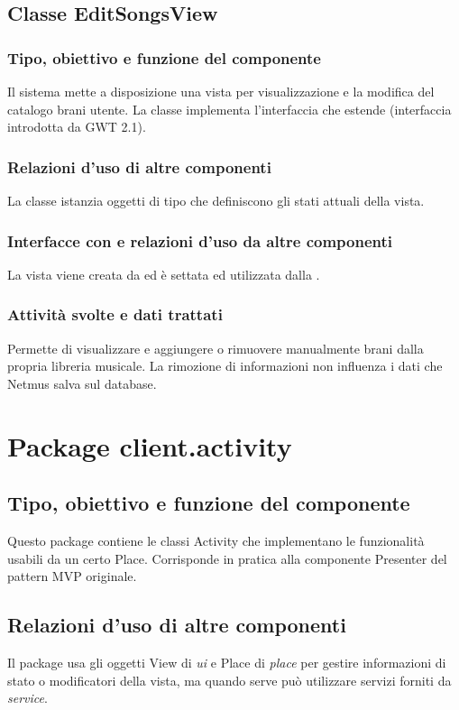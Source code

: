 \subsection{Classe EditSongsView}
\subsubsection*{Tipo, obiettivo e funzione del componente}
Il sistema mette a disposizione una vista per visualizzazione e la modifica del
catalogo brani utente. La classe  implementa l'interfaccia
 che estende  (interfaccia introdotta da GWT
2.1).
\subsubsection*{Relazioni d'uso di altre componenti}
La classe istanzia oggetti di tipo  che definiscono gli stati
attuali della vista.
\subsubsection*{Interfacce con e relazioni d'uso da altre componenti}
La vista viene creata da  ed \`e settata ed utilizzata dalla
.
\subsubsection*{Attivit\`a svolte e dati trattati}
Permette di visualizzare e aggiungere o rimuovere manualmente brani dalla
propria libreria musicale. La rimozione di informazioni non influenza i dati che
Netmus salva sul database.

\newpage
\section{Package client.activity} %
\subsection*{Tipo, obiettivo e funzione del componente}
Questo package contiene le classi Activity che implementano le funzionalit\`a
usabili da un certo Place. Corrisponde in pratica alla componente Presenter del
pattern MVP originale.
\subsection*{Relazioni d'uso di altre componenti}
Il package usa gli oggetti View di \emph{ui} e Place di \emph{place} per gestire
informazioni di stato o modificatori della vista, ma quando serve pu\`o
utilizzare servizi forniti da \emph{service}.
